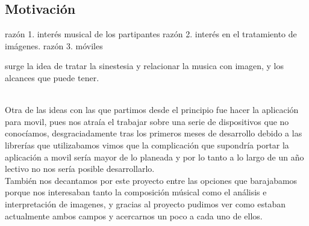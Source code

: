 \subsection{Motivación}


razón 1. interés musical de los partipantes
razón 2. interés en el tratamiento de imágenes.
razón 3. móviles

surge la idea de tratar la sinestesia y relacionar la musica con imagen, y los alcances que puede tener.




\newline
\\Otra de las ideas con las que partimos desde el principio fue hacer la aplicación para movil, pues nos atraía el trabajar sobre una serie de dispositivos que no conocíamos, desgraciadamente tras los primeros meses de desarrollo debido a las librerías que utilizabamos vimos que la complicación que supondría portar la aplicación a movil sería mayor de lo planeada y por lo tanto a lo largo de un año lectivo no nos sería posible desarrollarlo.
\\También nos decantamos por este proyecto entre las opciones que barajabamos porque nos interesaban tanto la composición músical como el análisis e interpretación de imagenes, y gracias al proyecto pudimos ver como estaban actualmente ambos campos y acercarnos un poco a cada uno de ellos.